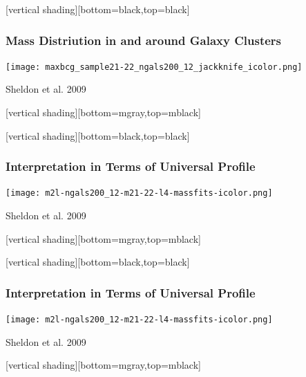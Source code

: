 \documentclass{beamer}
\begin{document}
{
    [vertical shading][bottom=black,top=black]


    \frame
    {
        \frametitle{Mass Distriution in and around Galaxy Clusters}

        \begin{center}
            \texttt{[image: maxbcg\_sample21-22\_ngals200\_12\_jackknife\_icolor.png]}
        \end{center}
        \hfill {\color{gold} Sheldon et al. 2009}
    }
    [vertical shading][bottom=mgray,top=mblack]
}




{
    [vertical shading][bottom=black,top=black]


    \frame
    {
        \frametitle{Interpretation in Terms of Universal Profile}

        \begin{center}
            \texttt{[image: m2l-ngals200\_12-m21-22-l4-massfits-icolor.png]}
        \end{center}
        \hfill {\color{gold} Sheldon et al. 2009}
    }

    [vertical shading][bottom=mgray,top=mblack]
}

{
    [vertical shading][bottom=black,top=black]


    \frame
    {
        \frametitle{Interpretation in Terms of Universal Profile}

        \begin{center}
            \texttt{[image: m2l-ngals200\_12-m21-22-l4-massfits-icolor.png]}
        \end{center}
        \hfill {\color{gold} Sheldon et al. 2009}
    }

    [vertical shading][bottom=mgray,top=mblack]
}
\end{document}
